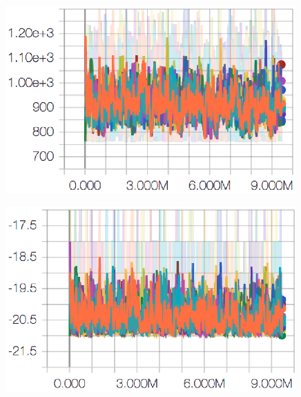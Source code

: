 \begin{figure}[ht]
    \begin{minipage}[b]{0.49\textwidth}
    \centering
    \includegraphics[width=0.99\textwidth]{pictures/5_length.eps}
    \label{fig:length5}
    \end{minipage}
    \begin{minipage}[b]{0.49\textwidth}
    \centering
    \includegraphics[width=0.99\textwidth]{pictures/5_reward.eps}
    \label{fig:reward5}
    \end{minipage}
    

\end{figure}
